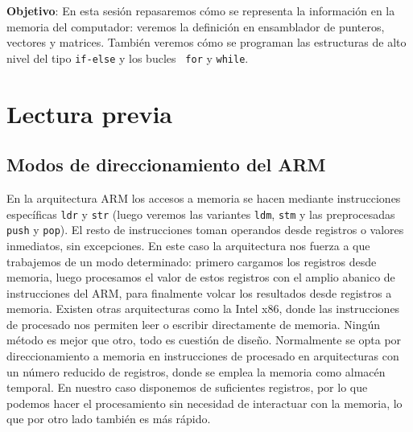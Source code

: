 \label{chp:TipDat}
\minitoc

{\bf Objetivo}:
En esta sesión repasaremos cómo se representa la
información en la memoria del computador: veremos la definición en
ensamblador de punteros, vectores y matrices. También veremos cómo se programan las
estructuras de alto nivel del tipo {\tt if-else} y los bucles {\tt
for} y {\tt while}.

\section{Lectura previa}

\subsection{Modos de direccionamiento del ARM}

En la arquitectura ARM los accesos a memoria se hacen mediante instrucciones
específicas {\tt ldr} y {\tt str} (luego veremos las variantes {\tt ldm},
{\tt stm} y las preprocesadas {\tt push} y {\tt pop}). El resto de instrucciones
toman operandos desde registros o valores inmediatos, sin excepciones. En este
caso la arquitectura nos fuerza a que trabajemos de un modo determinado: primero
cargamos los registros desde memoria, luego procesamos el valor de estos registros
con el amplio abanico de instrucciones del ARM, para finalmente volcar los
resultados desde registros a memoria. Existen otras arquitecturas como la Intel x86,
donde las instrucciones de procesado nos permiten leer o escribir directamente
de memoria. Ningún método es mejor que otro, todo es cuestión de diseño. Normalmente
se opta por direccionamiento a memoria en instrucciones de procesado en arquitecturas
con un número reducido de registros, donde se emplea la memoria como almacén
temporal. En nuestro caso disponemos de suficientes registros, por lo que podemos
hacer el procesamiento sin necesidad de interactuar con la memoria, lo que por otro
lado también es más rápido.

